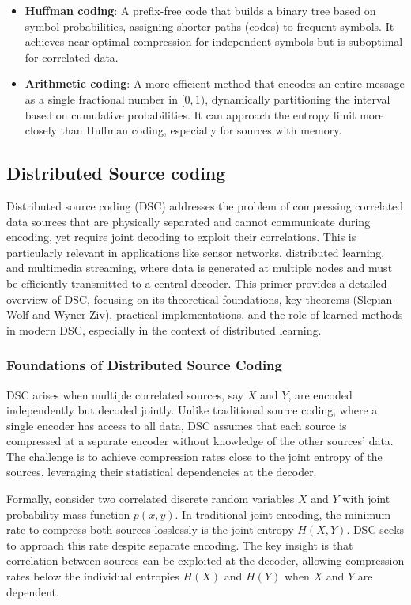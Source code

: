 \begin{itemize}
    \item \textbf{Huffman coding}: A prefix-free code that builds a binary tree based on symbol probabilities, assigning shorter paths (codes) to frequent symbols. It achieves near-optimal compression for independent symbols but is suboptimal for correlated data.
    \item \textbf{Arithmetic coding}: A more efficient method that encodes an entire message as a single fractional number in $[0,1)$, dynamically partitioning the interval based on cumulative probabilities. It can approach the entropy limit more closely than Huffman coding, especially for sources with memory.
\end{itemize}


\subsection{Distributed Source coding}
Distributed source coding (DSC) addresses the problem of compressing correlated data sources that are physically separated and cannot communicate during encoding, yet require joint decoding to exploit their correlations. This is particularly relevant in applications like sensor networks, distributed learning, and multimedia streaming, where data is generated at multiple nodes and must be efficiently transmitted to a central decoder. This primer provides a detailed overview of DSC, focusing on its theoretical foundations, key theorems (Slepian-Wolf and Wyner-Ziv), practical implementations, and the role of learned methods in modern DSC, especially in the context of distributed learning.

\subsubsection{Foundations of Distributed Source Coding}

DSC arises when multiple correlated sources, say $X$ and $Y$, are encoded independently but decoded jointly. Unlike traditional source coding, where a single encoder has access to all data, DSC assumes that each source is compressed at a separate encoder without knowledge of the other sources' data. The challenge is to achieve compression rates close to the joint entropy of the sources, leveraging their statistical dependencies at the decoder.

Formally, consider two correlated discrete random variables $X$ and $Y$ with joint probability mass function $p(x,y)$. In traditional joint encoding, the minimum rate to compress both sources losslessly is the joint entropy $H(X,Y)$.
DSC seeks to approach this rate despite separate encoding. The key insight is that correlation between sources can be exploited at the decoder, allowing compression rates below the individual entropies $H(X)$ and $H(Y)$ when $X$ and $Y$ are dependent.

